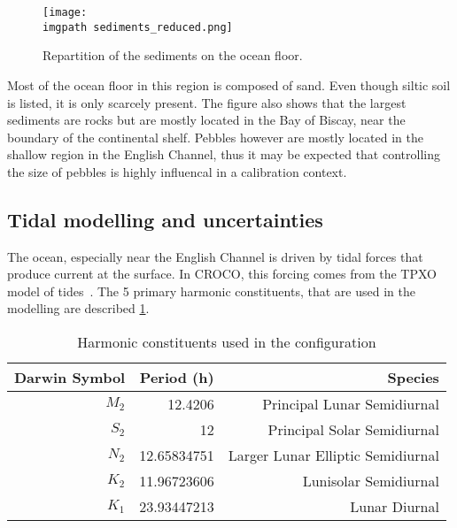 \documentclass[../../Main_ManuscritThese.tex]{subfiles}
\newcommand{\CROCO}{CROCO}
\newcommand\imgpath{/home/victor/acadwriting/Manuscrit/Text/Chapter5/img/}
\begin{document}
\begin{figure}[ht]
  \centering
  \texttt{[image: \\imgpath sediments\_reduced.png]}
  \caption{\label{fig:sediments_reduced} Repartition of the sediments on the ocean floor.}
\end{figure}

Most of the ocean floor in this region is composed of sand. Even
though siltic soil is listed, it is only scarcely present. The figure
also shows that the largest sediments are rocks but are mostly located
in the Bay of Biscay, near the boundary of the continental
shelf. Pebbles however are mostly located in the shallow region in the
English Channel, thus it may be expected that controlling the size of
pebbles is highly influencal in a calibration context.




\subsection{Tidal modelling and uncertainties}
\label{ssec:tidal_modelling}
The ocean, especially near the English Channel is driven by tidal
forces that produce current at the surface. In \CROCO, this forcing comes
from the TPXO model of tides~\cite{egbert_efficient_2002}. The 5
primary harmonic constituents, that are used in the modelling are
described \cref{tab:tides_components}.
\begin{table}[!h]
  \centering
  \begin{tabular}{rrr}\toprule
    Darwin Symbol & Period (h)   & Species                           \\ \midrule
    $M_2$         & 12.4206      & Principal Lunar Semidiurnal       \\
    $S_2$         & 12           & Principal Solar Semidiurnal       \\
    $N_2$         & 12.65834751  & Larger Lunar Elliptic Semidiurnal \\
    $K_2$         & 11.96723606  & Lunisolar Semidiurnal             \\
    $K_1$         & 23.93447213  & Lunar Diurnal                     \\
    \bottomrule
  \end{tabular}
  \caption{Harmonic constituents used in the configuration}
  \label{tab:tides_components}
\end{table}
\end{document}
